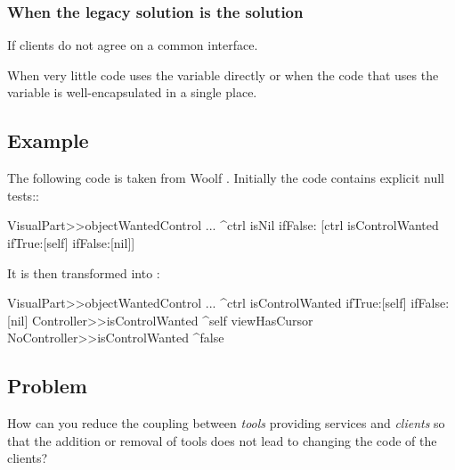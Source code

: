 \documentclass[a4paper,10pt,twoside]{book}
\begin{document}
\subsubsection*{When the legacy solution is the solution}

\begin{bulletlist}
\item If clients do not agree on a common interface.

\item When very little code uses the variable directly or when the code that uses the variable is well-encapsulated in a single place.
\end{bulletlist}

\subsection*{Example}

The following  code is taken from Woolf \cite{Wool98a}. Initially the code contains explicit null tests::

\begin{code}
VisualPart>>objectWantedControl
	...
	^ctrl isNil 
		ifFalse:
			[ctrl isControlWanted
				ifTrue:[self]
				ifFalse:[nil]]
\end{code}

It is then transformed into :

\begin{code}
VisualPart>>objectWantedControl
	...
	^ctrl isControlWanted
				ifTrue:[self]
				ifFalse:[nil]
Controller>>isControlWanted
	^self viewHasCursor
NoController>>isControlWanted
	^false
\end{code}





\subsection*{Problem}

How can you reduce the coupling between \emph{tools} providing services and \emph{clients} so that the addition or removal of tools does not lead to changing the code of the clients?
\end{document}
